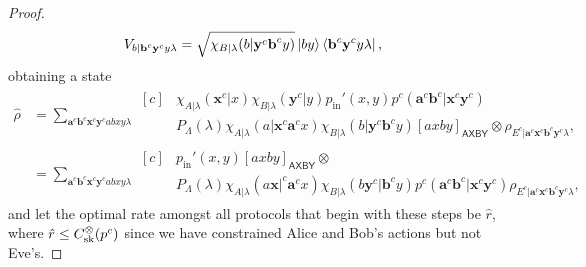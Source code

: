 \documentclass[10pt, a4paper]{article}
\numberwithin{equation}{section} %
\theoremstyle{definition}
\theoremstyle{plain}
\newcommand{\?}{\mathrel{?}} %
\newcommand{\cvec}[1]{\boldsymbol{\mathbf{#1}}}    %
\newcommand{\crv}[1]{\mathsf{#1}}
\newcommand{\proj}[2][]{{[#2]}_{#1}}
\newcommand{\prin}[1][p]{#1_{\mathrm{in}}}
\newcommand{\sk}{\rm sk}
\begin{document}
\begin{proof}
\begin{align*}
                   V_{b|\cvec{b}^c\cvec{y}^c y\lambda} &= \sqrt{\chi_{B|\lambda}(b|\cvec{y}^c\cvec{b}^cy)} \ket{by}\bra{\cvec{b}^c\cvec{y}^c y\lambda},
                 \end{align*}
                 obtaining a state
                 \begin{align*}
                   \hat{\rho} &= \sum_{\cvec{a}^c\cvec{b}^c \cvec{x}^c\cvec{y}^c abxy\lambda} \begin{aligned}[c]
          & \chi_{A|\lambda}(\cvec{x}^c|x) \chi_{B|\lambda}(\cvec{y}^c|y) \prin'(x,y) p^c(\cvec{a}^c\cvec{b}^c|\cvec{x}^c\cvec{y}^c) \\
          & P_{\Lambda}(\lambda) \chi_{A|\lambda}(a|\cvec{x}^c\cvec{a}^cx) \chi_{B|\lambda}(b|\cvec{y}^c\cvec{b}^cy) \proj[\crv{AXBY}]{axby} \otimes \rho_{E^c|\cvec{a}^c\cvec{x}^c \cvec{b}^c\cvec{y}^c\lambda},
                   \end{aligned} \\
                              &= \sum_{\cvec{a}^c\cvec{b}^c \cvec{x}^c\cvec{y}^c abxy\lambda} \begin{aligned}[c]
          & \prin'(x,y) \proj[\crv{AXBY}]{axby} \otimes \\
          & P_{\Lambda}(\lambda)  \chi_{A|\lambda}(a\cvec{x}|^c\cvec{a}^cx) \chi_{B|\lambda}(b\cvec{y}^c|\cvec{b}^cy) p^c(\cvec{a}^c\cvec{b}^c|\cvec{x}^c\cvec{y}^c) \rho_{E^c|\cvec{a}^c\cvec{x}^c \cvec{b}^c\cvec{y}^c\lambda},
                   \end{aligned}
                 \end{align*}
                 and let the optimal rate amongst all protocols that begin with these steps be \(\hat{r}\), where \(\hat{r} \leq C_{\sk}^{\otimes}(p^c)\) since we have constrained Alice and Bob's actions but not Eve's.


\end{proof}
\end{document}
